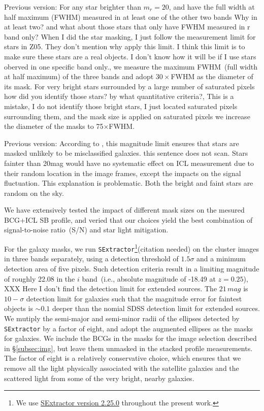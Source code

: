 \documentclass[fleqn,usenatbib]{mnras}
\newcommand*\xxx{{\color{red}XXX}}
\newcommand\ying[1]{{\color{red} {#1}}}
\newcommand\xkchen[1]{{\color{cyan} {#1}}}
\newcommand*\citeme{{\color{green}(citation needed)}}
\begin{document}
\xkchen{Previous version:}
For any star brighter than $m_r{=}20$, \xkchen{and have the full width at
half maximum (FWHM) measured in at least one of the other two
bands}\ying{Why in at least two? and what about those stars that only have
FWHM measured in r band only?} \xkchen{When I did the star masking, I just follow the measurement limit for stars in Z05. They don't mention why apply this limit. I think this limit is to make sure these stars are a real objects. I don't know how it will be if I use stars oberved in one specific band only.}, we measure the maximum FWHM~(full width at half maximum) of the three bands and adopt $30\times$FWHM as the diameter
of its mask. For very bright stars surrounded by a large number of
saturated pixels\ying{how did you identify those stars? by what
quantitative criteria?},\xkchen{This is a mistake, I do not identify those bright stars, I just located saturated pixels surrounding them, and the mask size is applied on saturated pixels} we increase the diameter of the masks to 75$\times$FWHM.

\xkchen{Previous version:}
\xkchen{According to , this magnitude limit ensures that stars are masked unlikely to be misclassified galaxies.} \ying{this sentence does not scan.} \xkchen{Stars fainter than 20mag would have no systematic effect on ICL measurement due to their random location in the
image frames, except the impacts on the signal fluctuation.}\ying{This
explanation is problematic. Both the bright and faint stars are random on
the sky.}

We have extensively tested the impact of different mask sizes on
the mesured BCG+ICL SB profile, and veried that our choices yield the best
combination of signal-to-noise ratio~(S/N) and star light mitigation.


For the galaxy masks, we run \texttt{SExtractor}\footnote{We use \href{https://github.com/astromatic/sextractor/releases}{SExtractor version 2.25.0} throughout the present work.}\citeme\xkchen{\citep{Bertin1996} } on the cluster
images in three bands separately, using a detection threshold of
$1.5\sigma$ and a minimum detection area of five pixels. Such detection
criteria result in a limiting magnitude of roughly \xkchen{22.08 in the $i$ band}~(i.e., absolute
magnitude of \xkchen{-18.49} at $z{=}0.25$), \xxx \xkchen{Here I don't find the detection limit for extended sources. The $21\,mag$ is $10{-}\sigma$ detection limit for galaxies such that the magnitude error for faintest objects is ${\sim}0.1$} deeper than the nomial SDSS
detection limit for extended sources. We mutiply the semi-major and
semi-minor radii of the ellipses detected by \texttt{SExtractor} by a
factor of eight, and adopt the augmented ellipses as the masks for
galaxies.  We include the BCGs in the masks for the image selection
described in \S\ref{subsec:img}, but leave them unmasked in the stacked
profile measurements. The factor of eight is a relatively conservative
choice, which ensures that we remove all the light physically associated
with the satellite galaxies and the scattered light from some of the very
bright, nearby galaxies.
\end{document}
